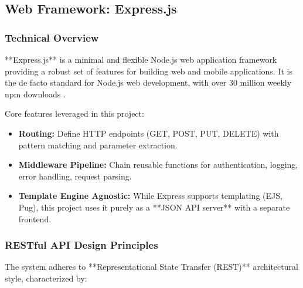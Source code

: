 \subsection{Web Framework: Express.js}

\subsubsection{Technical Overview}

**Express.js** is a minimal and flexible Node.js web application framework providing a robust set of features for building web and mobile applications. It is the de facto standard for Node.js web development, with over 30 million weekly npm downloads \cite{npm2024}.

Core features leveraged in this project:

\begin{itemize}
    \item \textbf{Routing:} Define HTTP endpoints (GET, POST, PUT, DELETE) with pattern matching and parameter extraction.
    \item \textbf{Middleware Pipeline:} Chain reusable functions for authentication, logging, error handling, request parsing.
    \item \textbf{Template Engine Agnostic:} While Express supports templating (EJS, Pug), this project uses it purely as a **JSON API server** with a separate frontend.
\end{itemize}

\subsubsection{RESTful API Design Principles}

The system adheres to **Representational State Transfer (REST)** architectural style, characterized by:

